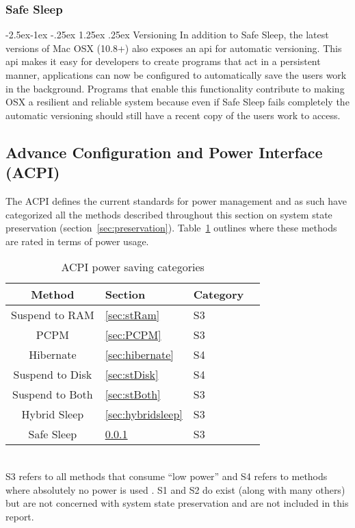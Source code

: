\documentclass[a4paper,12pt]{article}
\makeatletter
\renewcommand\paragraph{\@startsection{paragraph}{4}{\z@}%
{-2.5ex\@plus -1ex \@minus -.25ex}%
{1.25ex \@plus .25ex}%
{\normalfont\normalsize\bfseries}}
\makeatother
\begin{document}
\subsubsection{Safe Sleep}\label{sec:safesleep}
\paragraph{Versioning}
In addition to Safe Sleep, the latest versions of Mac OSX (10.8+) also exposes an api for automatic versioning. This api makes it easy for developers to create programs that act in a persistent manner, applications can now be configured to automatically save the users work in the background. 
Programs that enable this functionality contribute to making OSX a resilient and reliable system because even if Safe Sleep fails completely the automatic versioning should still have a recent copy of the users work to access.
\subsection{Advance Configuration and Power Interface (ACPI)}
The ACPI defines the current standards for power management \citep{ACPI} and as such have categorized all the methods described throughout this section on system state preservation (section~\ref{sec:preservation}). Table~\ref{table:categories} outlines where these methods are rated in terms of power usage.
\begin{table}[h!]
    \begin{center}
        \leavevmode
        \begin{tabular}{|cll|l|}\hline
            Method & Section & Category\\[0.1cm]\hline
            Suspend to RAM & \ref{sec:stRam} & S3\\
            PCPM & \ref{sec:PCPM} & S3 \\
            Hibernate & \ref{sec:hibernate} & S4\\
            Suspend to Disk & \ref{sec:stDisk} & S4 \\
            Suspend to Both & \ref{sec:stBoth} & S3 \\
            Hybrid Sleep & \ref{sec:hybridsleep} & S3 \\
            Safe Sleep & \ref{sec:safesleep} & S3 \\\hline
        \end{tabular}
    \end{center}
    \caption{ACPI power saving categories \citep{ACPI}}
    \label{table:categories}
\end{table}
\\S3 refers to all methods that consume ``low power'' and S4 refers to methods where absolutely no power is used \citep{ACPI}. S1 and S2 do exist (along with many others) but are not concerned with system state preservation and are not included in this report.
\end{document}

